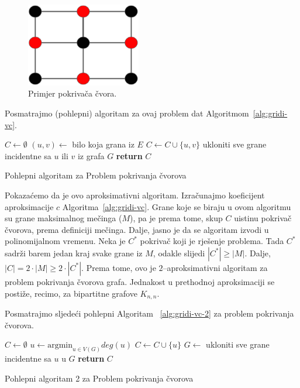 \documentclass[a4paper, utf8, 11pt, colorlinks]{book}
\begin{document}
  \begin{figure}
  	\centering
  	\includegraphics[width=50mm]{vertex-cover.eps}
  	\caption{Primjer pokrivača čvora.} 
  	\label{vertex-cover}
  \end{figure}
  
  Posmatrajmo (pohlepni) algoritam za ovaj problem dat Algoritmom~\ref{alg:gridi-vc}. 
  
  \begin{algorithm}[H] 
  	\begin{algorithmic}[1]
  		\STATE $C \gets \emptyset$
  		\STATE $(u,v) \gets$ bilo koja grana iz $E$
  		\STATE $C \gets C \cup \{u,v\}$
  		\STATE ukloniti sve grane incidentne sa  $u$ ili $v$ iz grafa $G$
  		\ENDWHILE
  		\STATE \textbf{return} $C$
  	\end{algorithmic}   
   
     \caption{Pohlepni algoritam za Problem pokrivanja čvorova}
 \label{alg:gridi-vc}
  \end{algorithm}
  
  \noindent Pokazaćemo da je ovo aproksimativni algoritam. Izračunajmo koeficijent aproksimacije $c$  Algoritma~\ref{alg:gridi-vc}.
  Grane koje se biraju u ovom algoritmu su grane maksimalnog mečinga ($M$), pa je prema tome, skup $C$ uistinu pokrivač čvorova, prema definiciji mečinga. Dalje, jasno je da se algoritam izvodi u polinomijalnom vremenu. Neka je $C^*$ pokrivač koji je rješenje problema. Tada $C^*$ sadrži barem jedan kraj svake grane iz $M$, odakle slijedi $|C^*|\geq |M|$. Dalje, $|C|= 2 \cdot |M| \geq 2 \cdot |C^*|$. Prema tome, ovo je $2$--aproksimativni algoritam za problem pokrivanja čvorova grafa. Jednakost u prethodnoj aproksimaciji se postiže, recimo, za bipartitne grafove $K_{n,n}$. 
  
  Posmatrajmo sljedeći pohlepni Algoritam ~\ref{alg:gridi-vc-2} za problem pokrivanja čvorova.  
  
  \begin{algorithm}[H] 
  	\begin{algorithmic}[1]
  		\STATE $C \gets \emptyset$
  		\STATE  $u \gets \textrm{argmin}_{u \in V(G)} deg(u)$
  		\STATE  $C \gets C \cup \{u\}$
  		\STATE $G \gets$ ukloniti sve grane incidentne sa $u$ u $G$  
  		\ENDWHILE
  		\STATE \textbf{return} $C$
  	\end{algorithmic}
     	\caption{Pohlepni algoritam 2 za Problem pokrivanja čvorova}
        \label{alg:gridi-vc-2}
  \end{algorithm}
  
\end{document}
